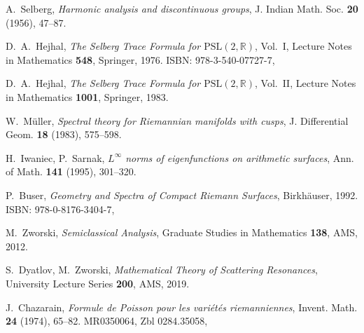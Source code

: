 \documentclass[12pt]{amsart}
\numberwithin{equation}{section}
\theoremstyle{plain}
\theoremstyle{definition}
\theoremstyle{remark}
\begin{document}
\begin{thebibliography}{99}

A.~Selberg,
\textit{Harmonic analysis and discontinuous groups},
J. Indian Math. Soc. \textbf{20} (1956), 47--87.

D.~A.~Hejhal,
\textit{The Selberg Trace Formula for $\mathrm{PSL}(2,\mathbb{R})$}, Vol.~I,
Lecture Notes in Mathematics \textbf{548}, Springer, 1976.
ISBN: 978-3-540-07727-7, 

D.~A.~Hejhal,
\textit{The Selberg Trace Formula for $\mathrm{PSL}(2,\mathbb{R})$}, Vol.~II,
Lecture Notes in Mathematics \textbf{1001}, Springer, 1983.

W.~M\"uller,
\textit{Spectral theory for Riemannian manifolds with cusps},
J. Differential Geom. \textbf{18} (1983), 575--598.

H.~Iwaniec, P.~Sarnak,
\textit{$L^\infty$ norms of eigenfunctions on arithmetic surfaces},
Ann. of Math. \textbf{141} (1995), 301--320.

P.~Buser,
\textit{Geometry and Spectra of Compact Riemann Surfaces},
Birkh\"auser, 1992.
ISBN: 978-0-8176-3404-7, 

M.~Zworski,
\textit{Semiclassical Analysis},
Graduate Studies in Mathematics \textbf{138}, AMS, 2012.

S.~Dyatlov, M.~Zworski,
\textit{Mathematical Theory of Scattering Resonances},
University Lecture Series \textbf{200}, AMS, 2019.

J.~Chazarain,
\textit{Formule de Poisson pour les vari\'et\'es riemanniennes},
Invent. Math. \textbf{24} (1974), 65--82.
MR0350064, Zbl 0284.35058, 

\end{thebibliography}
\end{document}
